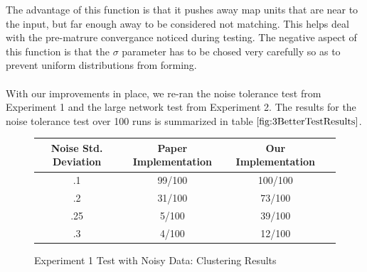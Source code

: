 \documentclass[a4paper,10pt]{article}
\begin{document}
The advantage of this function is that it pushes away map units that are near to the input,
but far enough away to be considered not matching.  This helps deal with the pre-matrure convergance
noticed during testing. The negative aspect of this function is that the $\sigma$ parameter has to
be chosed very carefully so as to prevent uniform distributions from forming.
\\
\\
With our improvements in place, we re-ran the noise tolerance test from Experiment 1 and the large
network test from Experiment 2.  The results for the noise tolerance test over 100 runs is
summarized in table $\ref{fig:3BetterTestResults}$.
\begin{figure}[ht]
\begin{center}
  \begin{tabular}{ | c | c | c | c | }
    \hline
    Noise Std. Deviation & Paper Implementation& Our Implementation \\ \hline
    .1 & 99/100 & 100/100 \\ \hline
    .2 & 31/100 & 73/100\\ \hline
    .25 & 5/100 & 39/100\\ \hline
    .3 &  4/100 & 12/100\\
    \hline
  \end{tabular}
\end{center}
\caption{Experiment 1 Test with Noisy Data: Clustering Results }
\label{fig:3BetterTestResults}
\end{figure}
\end{document}
